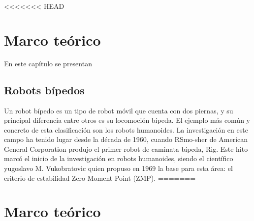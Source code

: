 <<<<<<< HEAD
\chapter{Marco teórico}
En este capítulo se presentan 
\section{Robots bípedos}
Un robot bípedo es un tipo de robot móvil que cuenta con dos piernas, y su principal diferencia entre otros es su locomoción bípeda. \cite{yang2017stateart} El ejemplo más común y concreto de esta clasificación son los robots humanoides. La investigación en este campo ha tenido lugar desde la década de 1960, cuando RSmo-sher de American General Corporation produjo el primer robot de caminata bípeda, Rig. Este hito marcó el inicio de la investigación en robots humanoides, siendo el científico yugoslavo M. Vukobratovic quien propuso en 1969 la base para esta área: el criterio de estabilidad Zero Moment Point (ZMP).\cite{chen2013walking}
=======
\chapter{Marco teórico}\label{sec:marcoteorico}
